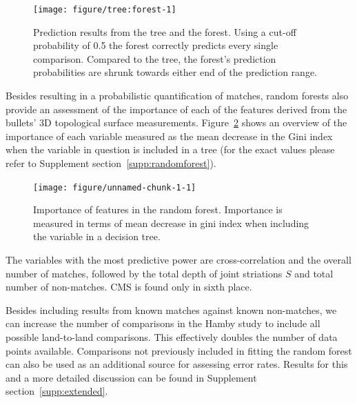 \documentclass[aoas, preprint]{imsart}\usepackage[]{graphicx}\usepackage[]{color}
\newenvironment{knitrout}{}{} %
\begin{document}
\begin{figure}[hbtp]
  \centering
\begin{knitrout}
\color{fgcolor}
\texttt{[image: figure/tree:forest-1]} 

\end{knitrout}
\caption{\label{fig:tree-forest}Prediction results from the tree and the forest. Using a cut-off probability of 0.5 the forest correctly predicts every single comparison. Compared to the tree, the forest's prediction probabilities are  shrunk towards either end of the prediction range. }
\end{figure}

Besides resulting in a probabilistic quantification of matches, random forests also provide an assessment of the importance of each of the features derived from the bullets' 3D topological surface measurements. Figure~\ref{fig:importance} shows an overview of the importance of each variable measured as the mean decrease in the Gini index when the variable in question is included in a tree (for the exact values please refer to Supplement section~\ref{supp:randomforest}). 
\begin{figure}
\begin{knitrout}
\color{fgcolor}
\texttt{[image: figure/unnamed-chunk-1-1]} 

\end{knitrout}
\caption{\label{fig:importance}Importance of features in the random forest. Importance is measured in terms of mean decrease in gini index when including the variable in a decision tree.}
\end{figure}


The variables with the most predictive power are cross-correlation and the overall number of matches, followed by the total depth of joint striations $S$ and total number of non-matches. CMS is found only in sixth place.

Besides including results from known matches against known non-matches, we can increase the number of comparisons in the Hamby study to include all possible land-to-land comparisons. This effectively doubles the number of data points available. Comparisons not previously included in fitting the random forest can also be used as an additional source for assessing error rates.  Results for this and a more detailed discussion can be found in Supplement section~\ref{supp:extended}.
\end{document}
